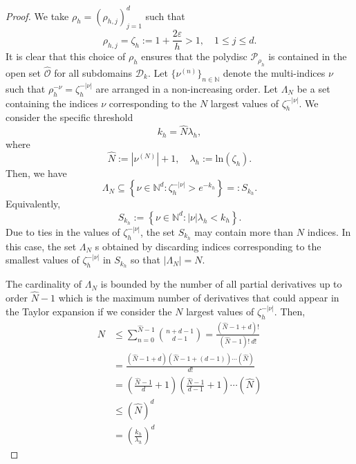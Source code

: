 \documentclass[10pt,a4paper]{amsart}
\begin{document}
\begin{proof}
    We take $\rho_h=(\rho_{h,j})_{j=1}^d$ such that
    \begin{equation}
        \rho_{h,j}=\zeta_h :=1+\frac{2\varepsilon}{h}>1, \quad 1\leq j \leq d.
        \label{rho}
    \end{equation}
    It is clear that this choice of $\rho_h$ ensures that the polydisc $\mathcal{P}_{\rho_h}$ is contained in the open set $\hat{\mathcal{O}}$ for all subdomains $\mathcal{D}_k$. Let $\{\nu^{(n)}\}_{n \in \mathbb{N}}$ denote the multi-indices $\nu$ such that $\rho_h^{-\nu}=\zeta_h^{-|\nu|}$ are arranged in a non-increasing order. Let $\Lambda_N$ be a set containing the indices $\nu$ corresponding to the $N$ largest values of $\zeta_h^{-|\nu|}$. We consider the specific threshold
    \begin{equation}
        k_h= \hat{N} \lambda_{h}, 
        \label{kh}
    \end{equation}
    where
    \begin{equation}
        \hat{N}:=\left|\nu^{(N)}\right| +1, \quad \lambda_h:= \text{ln} (\zeta_h).
        \label{lambda def}
    \end{equation}
    Then, we have 
    \begin{equation}
        \Lambda_N\subseteq\left\{\nu \in \mathbb{N}^d: \zeta_h^{-|\nu|} > e^{-k_h}\right\}=:S_{k_h}.
    \end{equation}
    Equivalently, 
    \begin{equation}
        S_{k_h}:=\left\{\nu \in \mathbb{N}^d: \left|\nu\right| \lambda_h < k_h\right\}.
        \label{k}
    \end{equation}
    Due to ties in the values of $\zeta_h^{-|\nu|}$, the set $S_{k_h}$ may contain more than $N$ indices. In this case, the set $\Lambda_N$ s obtained by discarding indices corresponding to the smallest values of $\zeta_h^{-|\nu|}$ in $S_{k_h}$ so that $|\Lambda_N| = N$.
    
    The cardinality of $\Lambda_{N}$ is bounded by the number of all partial derivatives up to order $\hat{N}-1$ which is the maximum number of derivatives that could appear in the Taylor expansion if we consider the $N$ largest values of $\zeta_h^{-|\nu|}$. Then,
    \begin{align}
        N&\leq \sum_{n=0}^{\hat{N}-1} {n+d-1 \choose d-1} = \frac{\left(\hat{N}-1+d\right)!}{\left(\hat{N}-1\right)! \ d!}\\
        &= \frac{\left(\hat{N}-1+d\right) \left(\hat{N}-1+(d-1)\right) \cdots \left(\hat{N}\right)}{d!}\\
        &=\left(\frac{\hat{N}-1}{d} +1\right)\left(\frac{\hat{N}-1}{d-1} +1 \right) \cdots (\hat{N})\\
        &\leq (\hat{N})^d\\
        &=\left( \frac{k_h}{\lambda_h}\right)^d
        \label{est N}
    \end{align}
    

\end{proof}
\end{document}
